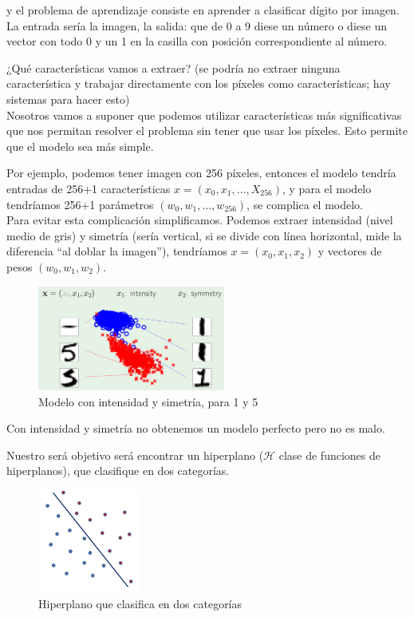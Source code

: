 \documentclass[11pt,a4paper]{article}
\theoremstyle{definition}
\begin{document}
	y el problema de aprendizaje consiste en aprender a clasificar dígito por imagen. La entrada sería la imagen, la salida: que de 0 a 9 diese un número o diese un vector con todo 0 y un 1 en la casilla con posición correspondiente al número.
	
	¿Qué características vamos a extraer? (se podría no extraer ninguna característica y trabajar directamente con los píxeles como características; hay sistemas para hacer esto)\\
	Nosotros vamos a suponer que podemos utilizar características más significativas que nos permitan resolver el problema sin tener que usar los píxeles. Esto permite que el modelo sea más simple. 
	
	Por ejemplo, podemos tener imagen con 256 píxeles, entonces el modelo tendría entradas de 256+1 características $x=(x_0,x_1,\ldots, X_{256})$, y para el modelo tendríamos 256+1 parámetros $(w_0,w_1,\ldots,w_{256})$, se complica el modelo.\\
	Para evitar esta complicación simplificamos. Podemos extraer intensidad (nivel medio de gris) y simetría (sería vertical, si se divide con línea horizontal, mide la diferencia ``al doblar la imagen''), tendríamos $x=(x_0,x_1,x_2)$ y vectores de pesos $(w_0,w_1,w_2)$.
	\begin{figure}[H]
	\centering
	\includegraphics[width=0.55\textwidth]{images/inten_sim}
	\caption{Modelo con intensidad y simetría, para 1 y 5}
	\end{figure}
	Con intensidad y simetría no obtenemos un modelo perfecto pero no es malo.
	
	Nuestro será objetivo será encontrar un hiperplano ($\mathcal{H}$ clase de funciones de hiperplanos), que clasifique en dos categorías.
	\begin{figure}[H]
	\centering
	\includegraphics[width=0.3\textwidth]{images/clasifi}
	\caption{Hiperplano que clasifica en dos categorías}
	\end{figure}
	
\end{document}

